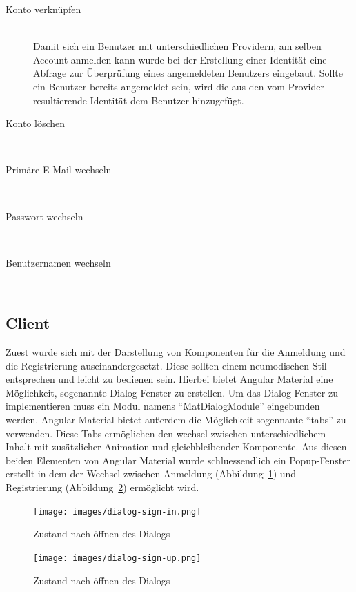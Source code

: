 \documentclass[paper=a4,fontsize=12pt,parskip=half]{scrartcl}
\begin{document}
	\begin{description}
		\item[Konto verknüpfen]\hfill\\
		Damit sich ein Benutzer mit unterschiedlichen Providern, am selben Account anmelden kann wurde bei der Erstellung einer Identität eine Abfrage zur Überprüfung eines angemeldeten Benutzers eingebaut. Sollte ein Benutzer bereits angemeldet sein, wird die aus den vom Provider resultierende Identität dem Benutzer hinzugefügt.
		\item[Konto löschen]\hfill\\
		\item[Primäre E-Mail wechseln]\hfill\\
		\item[Passwort wechseln]\hfill\\
		\item[Benutzernamen wechseln]\hfill\\
	\end{description}

	\subsection{Client}
	\label{sec: client}
	Zuest wurde sich mit der Darstellung von Komponenten für die Anmeldung und die Registrierung auseinandergesetzt. Diese sollten einem neumodischen Stil entsprechen und leicht zu bedienen sein. Hierbei bietet Angular Material eine Möglichkeit, sogenannte Dialog-Fenster zu erstellen. Um das Dialog-Fenster zu implementieren muss ein Modul namens \enquote{MatDialogModule} eingebunden werden. Angular Material bietet außerdem die Möglichkeit sogennante \enquote{tabs} zu verwenden. Diese Tabs ermöglichen den wechsel zwischen unterschiedlichem Inhalt mit zusätzlicher Animation und gleichbleibender Komponente. Aus diesen beiden Elementen von Angular Material wurde schluessendlich ein Popup-Fenster erstellt in dem der Wechsel zwischen Anmeldung (Abbildung~\ref{fig:dialog_sign_in}) und Registrierung (Abbildung~\ref{fig:dialog_sign_up}) ermöglicht wird. 
	
	\begin{figure}
		\texttt{[image: images/dialog-sign-in.png]}
		\caption{Zustand nach öffnen des Dialogs}
		\label{fig:dialog_sign_in}
	\end{figure}

	\begin{figure}
		\texttt{[image: images/dialog-sign-up.png]}
		\caption{Zustand nach öffnen des Dialogs}
		\label{fig:dialog_sign_up}
	\end{figure}
\end{document}
